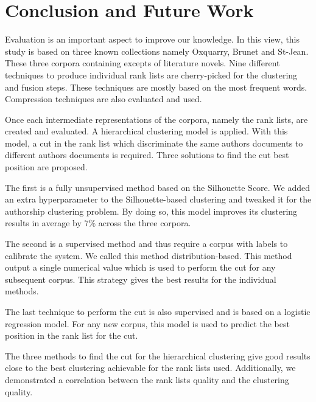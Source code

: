 \chapter{Conclusion and Future Work\label{sec:conclusion}}


Evaluation is an important aspect to improve our knowledge.
In this view, this study is based on three known collections namely Oxquarry, Brunet and St-Jean.
These three corpora containing excepts of literature novels.
Nine different techniques to produce individual rank lists are cherry-picked for the clustering and fusion steps.
These techniques are mostly based on the most frequent words.
Compression techniques are also evaluated and used.

Once each intermediate representations of the corpora, namely the rank lists, are created and evaluated.
A hierarchical clustering model is applied.
With this model, a cut in the rank list which discriminate the same authors documents to different authors documents is required.
Three solutions to find the cut best position are proposed.

The first is a fully unsupervised method based on the Silhouette Score.
We added an extra hyperparameter to the Silhouette-based clustering and tweaked it for the authorship clustering problem.
By doing so, this model improves its clustering results in average by $7\%$ across the three corpora.

The second is a supervised method and thus require a corpus with labels to calibrate the system.
We called this method distribution-based.
This method output a single numerical value which is used to perform the cut for any subsequent corpus.
This strategy gives the best results for the individual methods.

The last technique to perform the cut is also supervised and is based on a logistic regression model.
For any new corpus, this model is used to predict the best position in the rank list for the cut.

The three methods to find the cut for the hierarchical clustering give good results close to the best clustering achievable for the rank lists used.
Additionally, we demonstrated a correlation between the rank lists quality and the clustering quality.

